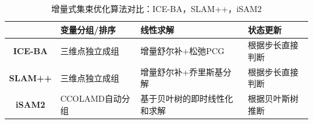 \begin{table}[htb!]
    \centering
    \caption{增量式集束优化算法对比：ICE-BA，SLAM++，iSAM2}
    \vspace{6pt}
    \begin{tabularx}{\textwidth}{c|XXX}
        \toprule
                        & \textbf{变量分组/排序} & \textbf{线性求解}            & \textbf{状态更新} \\
        \midrule
        \textbf{ICE-BA} & 三维点独立成组         & 增量舒尔补+松弛PCG           & 根据步长直接判断  \\
        \textbf{SLAM++} & 三维点独立成组         & 增量舒尔补+乔里斯基分解      & 根据步长直接判断  \\
        \textbf{iSAM2}  & CCOLAMD自动分组        & 基于贝叶树的即时线性化和求解 & 根据贝叶斯树推断  \\
        \bottomrule
    \end{tabularx}
    \label{tab:comp}
\end{table}
